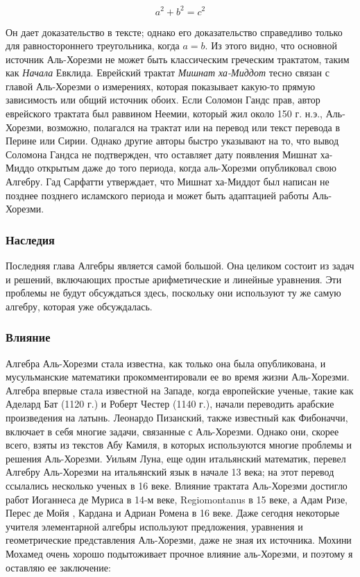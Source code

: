 $$a^2 + b^2 = c^2$$

Он дает доказательство в тексте; однако его доказательство справедливо только для равностороннего треугольника, когда $a = b$. Из этого видно, что основной источник Аль-Хорезми не может быть классическим греческим трактатом, таким как \textit{Начала} Евклида. Еврейский трактат \textit{Мишнат ха-Миддот} тесно связан с главой Аль-Хорезми о измерениях, которая показывает какую-то прямую зависимость или общий источник обоих. Если Соломон Гандс прав, автор еврейского трактата был раввином Неемии, который жил около 150 г. н.э., Аль-Хорезми, возможно, полагался на трактат или на перевод или текст перевода в Перине или Сирии. Однако другие авторы быстро указывают на то, что вывод Соломона Гандса не подтвержден, что оставляет дату появления Мишнат ха-Миддо открытым даже до того периода, когда аль-Хорезми опубликовал свою Алгебру. Гад Сарфатти утверждает, что Мишнат ха-Миддот был написан не позднее позднего исламского периода и может быть адаптацией работы Аль-Хорезми.

\subsubsection{Наследия}
Последняя глава Алгебры является самой большой. Она целиком состоит из задач и решений, включающих простые арифметические и линейные уравнения. Эти проблемы не будут обсуждаться здесь, поскольку они используют ту же самую алгебру, которая уже обсуждалась.

\subsubsection{Влияние}
Алгебра Аль-Хорезми стала известна, как только она была опубликована, и мусульманские математики прокомментировали ее во время жизни Аль-Хорезми. Алгебра впервые стала известной на Западе, когда европейские ученые, такие как Аделард Бат (1120 г.) и Роберт Честер (1140 г.), начали переводить арабские произведения на латынь. Леонардо Пизанский, также известный как Фибоначчи, включает в себя многие задачи, связанные с Аль-Хорезми. Однако они, скорее всего, взяты из текстов Абу Камиля, в которых используются многие проблемы и решения Аль-Хорезми. Уильям Луна, еще один итальянский математик, перевел Алгебру Аль-Хорезми на итальянский язык в начале 13 века; на этот перевод ссылались несколько ученых в 16 веке. Влияние трактата Аль-Хорезми достигло работ Иоганнеса де Муриса в 14-м веке, Regiomontanus в 15 веке, а Адам Ризе, Перес де Мойя , Кардана и Адриан Ромена в 16 веке. Даже сегодня некоторые учителя элементарной алгебры используют предложения, уравнения и геометрические представления Аль-Хорезми, даже не зная их источника. Мохини Мохамед очень хорошо подытоживает прочное влияние аль-Хорезми, и поэтому я оставляю ее заключение:


